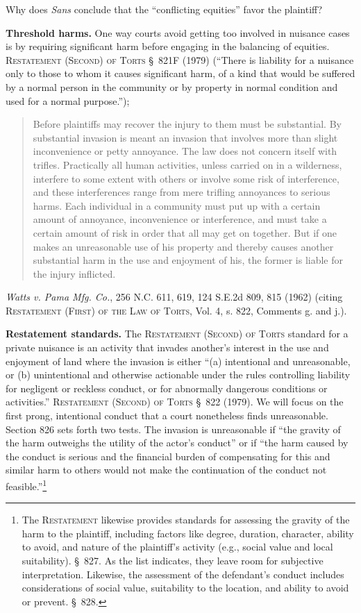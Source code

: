 
\item Why does \textit{Sans} conclude that the ``conflicting equities'' favor
the plaintiff?

\item \textbf{Threshold harms.} One way courts avoid getting too involved in
nuisance cases is by requiring significant harm before engaging in the balancing
of equities. \textsc{Restatement (Second) of Torts} \S~821F (1979) (``There is
liability for a nuisance only to those to whom it causes significant harm, of a
kind that would be suffered by a normal person in the community or by property
in normal condition and used for a normal purpose.''); 
\begin{quote}
Before plaintiffs may recover the injury to them must be substantial. By
substantial invasion is meant an invasion that involves more than slight
inconvenience or petty annoyance. The law does not concern itself with trifles.
Practically all human activities, unless carried on in a wilderness, interfere
to some extent with others or involve some risk of interference, and these
interferences range from mere trifling annoyances to serious harms. Each
individual in a community must put up with a certain amount of annoyance,
inconvenience or interference, and must take a certain amount of risk in order
that all may get on together. But if one makes an unreasonable use of his
property and thereby causes another substantial harm in the use and enjoyment of
his, the former is liable for the injury inflicted.
\end{quote}
\emph{Watts v. Pama Mfg. Co.}, 256 N.C. 611, 619, 124 S.E.2d 809, 815 (1962)
(citing \textsc{Restatement (First) of the Law of Torts}, Vol. 4, s. 822,
Comments g. and j.).

\item \textbf{Restatement standards.} The \textsc{Restatement (Second) of Torts}
standard for a private nuisance is an activity that invades another's interest
in the use and enjoyment of land where the invasion is either ``(a) intentional
and unreasonable, or (b) unintentional and otherwise actionable under the rules
controlling liability for negligent or reckless conduct, or for abnormally
dangerous conditions or activities.'' \textsc{Restatement (Second) of Torts}
\S~822 (1979). We will focus on the first prong, intentional conduct that a
court nonetheless finds unreasonable. Section 826 sets forth two tests. The
invasion is unreasonable if ``the gravity of the harm outweighs the utility of
the actor's conduct'' or if ``the harm caused by the conduct is serious and the
financial burden of compensating for this and similar harm to others would not
make the continuation of the conduct not feasible.''\footnote{The
\textsc{Restatement} likewise provides standards for assessing the gravity of
the harm to the plaintiff, including factors like degree, duration, character,
ability to avoid, and nature of the plaintiff's activity (e.g., social value and
local suitability). \S~827. As the list indicates, they leave room for
subjective interpretation. Likewise, the assessment of the defendant's conduct
includes considerations of social value, suitability to the location, and
ability to avoid or prevent. \S~828.}

